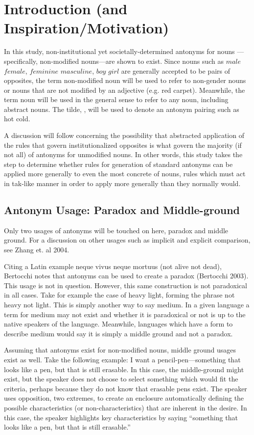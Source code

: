\section {Introduction (and Inspiration/Motivation)}
In this study, non-institutional yet societally-determined antonyms for nouns —specifically, non-modified nouns—are shown to exist.  Since nouns such as $male$ \opp $female$, $feminine$ \opp $masculine$, $boy$ \opp $girl$ are generally accepted to be pairs of opposites, the term non-modified noun will be used to refer to non-gender nouns or nouns that are not modified by an adjective (e.g. red carpet).  Meanwhile, the term noun will be used in the general sense to refer to any noun, including abstract nouns.  The tilde, \oppnospace, will be used to denote an antonym pairing such as hot \opp cold.  

A discussion will follow concerning the possibility that abstracted application of the rules that govern institutionalized opposites is what govern the majority (if not all) of antonyms for unmodified nouns.  In other words, this study takes the step to determine whether rules for generation of standard antonyms can be applied more generally to even the most concrete of nouns, rules which must act in tak-like manner in order to apply more generally than they normally would.

\subsection {Antonym Usage: Paradox and Middle-ground} Only two usages of antonyms will be touched on here, paradox and middle ground.  For a discussion on other usages such as implicit and explicit comparison, see Zhang et. al 2004.  

Citing a Latin example neque vivus neque mortuus (not alive not dead), Bertocchi notes that antonyms can be used to create a paradox (Bertocchi 2003).  This usage is not in question.  However, this same construction is not paradoxical in all cases.  Take for example the case of heavy \opp light, forming the phrase not heavy not light.  This is simply another way to say medium.  In a given language a term for medium may not exist and whether it is paradoxical or not is up to the native speakers of the language.  Meanwhile, languages which have a form to describe medium would say it is simply a middle ground and not a paradox. 

Assuming that antonyms exist for non-modified nouns, middle ground usages exist as well.  Take the following example: I want a pencil-pen—something that looks like a pen, but that is still erasable.  In this case, the middle-ground might exist, but the speaker does not choose to select something which would fit the criteria, perhaps because they do not know that erasable pens exist.  The speaker uses opposition, two extremes, to create an enclosure automatically defining the possible characteristics (or non-characteristics) that are inherent in the desire.  In this case, the speaker highlights key characteristics by saying “something that looks like a pen, but that is still erasable.”

